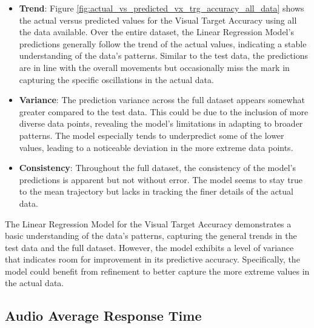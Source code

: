 \begin{itemize}
    \item \textbf{Trend}: Figure \ref{fig:actual_vs_predicted_vx_trg_accuracy_all_data} shows the actual versus predicted values for the Visual Target Accuracy using all the data available. Over the entire dataset,
    the Linear Regression Model's predictions generally follow the trend of the actual values, indicating a stable understanding of the data's patterns. Similar to the test data, the predictions are in line with the
    overall movements but occasionally miss the mark in capturing the specific oscillations in the actual data.
    
    \item \textbf{Variance}: The prediction variance across the full dataset appears somewhat greater compared to the test data. This could be due to the inclusion of more diverse data points, revealing the model's 
    limitations in adapting to broader patterns. The model especially tends to underpredict some of the lower values, leading to a noticeable deviation in the more extreme data points.
    
    \item \textbf{Consistency}: Throughout the full dataset, the consistency of the model's predictions is apparent but not without error. The model seems to stay true to the mean trajectory but lacks in tracking the 
    finer details of the actual data. 
        
\end{itemize}

The Linear Regression Model for the Visual Target Accuracy demonstrates a basic understanding of the data's patterns, capturing the general trends in the test data and the full dataset. However, the model exhibits
a level of variance that indicates room for improvement in its predictive accuracy. Specifically, the model could benefit from refinement to better capture the more extreme values in the actual data.

\subsection*{Audio Average Response Time}


